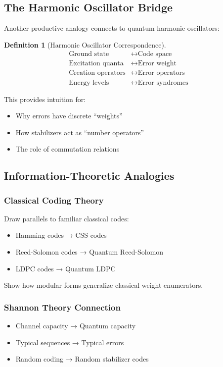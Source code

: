 \documentclass[11pt,a4paper]{article}
\newtheorem{definition}[theorem]{Definition}
\begin{document}
\subsection{The Harmonic Oscillator Bridge}

Another productive analogy connects to quantum harmonic oscillators:

\begin{definition}[Harmonic Oscillator Correspondence]
\begin{align}
\text{Ground state} &\leftrightarrow \text{Code space} \\
\text{Excitation quanta} &\leftrightarrow \text{Error weight} \\
\text{Creation operators} &\leftrightarrow \text{Error operators} \\
\text{Energy levels} &\leftrightarrow \text{Error syndromes}
\end{align}
\end{definition}

This provides intuition for:
\begin{itemize}
\item Why errors have discrete ``weights''
\item How stabilizers act as ``number operators''
\item The role of commutation relations
\end{itemize}

\subsection{Information-Theoretic Analogies}

\subsubsection{Classical Coding Theory}
Draw parallels to familiar classical codes:
\begin{itemize}
\item Hamming codes → CSS codes
\item Reed-Solomon codes → Quantum Reed-Solomon
\item LDPC codes → Quantum LDPC
\end{itemize}

Show how modular forms generalize classical weight enumerators.

\subsubsection{Shannon Theory Connection}
\begin{itemize}
\item Channel capacity → Quantum capacity
\item Typical sequences → Typical errors
\item Random coding → Random stabilizer codes
\end{itemize}
\end{document}
